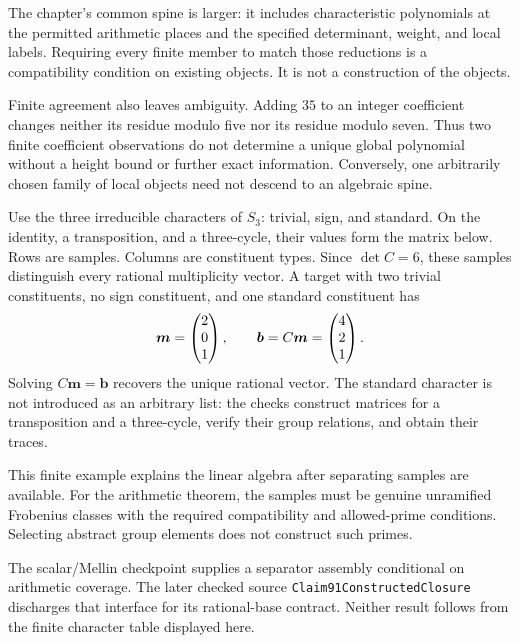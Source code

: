The chapter's common spine is larger: it includes characteristic polynomials at the permitted arithmetic places and the specified determinant, weight, and local labels. Requiring every finite member to match those reductions is a compatibility condition on existing objects. It is not a construction of the objects.

Finite agreement also leaves ambiguity. Adding $35$ to an integer coefficient changes neither its residue modulo five nor its residue modulo seven. Thus two finite coefficient observations do not determine a unique global polynomial without a height bound or further exact information. Conversely, one arbitrarily chosen family of local objects need not descend to an algebraic spine.

Use the three irreducible characters of $S_3$: trivial, sign, and standard. On the identity, a transposition, and a three-cycle, their values form the matrix below. Rows are samples. Columns are constituent types.
Since $\det C=6$, these samples distinguish every rational multiplicity vector. A target with two trivial constituents, no sign constituent, and one standard constituent has
\[
\bm m=\begin{pmatrix}2\\0\\1\end{pmatrix},\qquad
\bm b=C\bm m=\begin{pmatrix}4\\2\\1\end{pmatrix}.
\]
Solving $C\bm m=\bm b$ recovers the unique rational vector. The standard character is not introduced as an arbitrary list: the checks construct matrices for a transposition and a three-cycle, verify their group relations, and obtain their traces.

This finite example explains the linear algebra after separating samples are available. For the arithmetic theorem, the samples must be genuine unramified Frobenius classes with the required compatibility and allowed-prime conditions. Selecting abstract group elements does not construct such primes.

The scalar/Mellin checkpoint supplies a separator assembly conditional on arithmetic coverage. The later checked source \texttt{Claim91ConstructedClosure} discharges that interface for its rational-base contract. Neither result follows from the finite character table displayed here.

